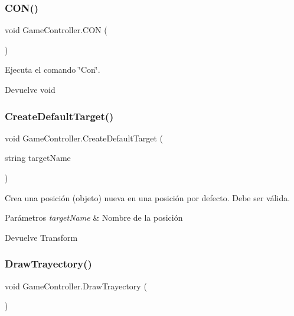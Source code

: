 \subsubsection{\texorpdfstring{CON()}{CON()}}
{\footnotesize\ttfamily void Game\+Controller.\+C\+ON (\begin{DoxyParamCaption}{ }\end{DoxyParamCaption})\hspace{0.3cm}{\ttfamily [inline]}}

Ejecuta el comando \char`\"{}\+Con\char`\"{}. \begin{DoxyReturn}{Devuelve}
void 
\end{DoxyReturn}
\mbox{\label{class_game_controller_a0f08cc86bd15fbe811ce9e54a83e67d9}} 
\subsubsection{\texorpdfstring{CreateDefaultTarget()}{CreateDefaultTarget()}}
{\footnotesize\ttfamily void Game\+Controller.\+Create\+Default\+Target (\begin{DoxyParamCaption}\item[{string}]{target\+Name }\end{DoxyParamCaption})\hspace{0.3cm}{\ttfamily [inline]}}

Crea una posición (objeto) nueva en una posición por defecto. Debe ser válida. 
\begin{DoxyParams}{Parámetros}
{\em target\+Name} & Nombre de la posición \\
\hline
\end{DoxyParams}
\begin{DoxyReturn}{Devuelve}
Transform 
\end{DoxyReturn}
\mbox{\label{class_game_controller_afd55aa0db0046a73a2b9bb57dc56d373}} 
\subsubsection{\texorpdfstring{DrawTrayectory()}{DrawTrayectory()}}
{\footnotesize\ttfamily void Game\+Controller.\+Draw\+Trayectory (\begin{DoxyParamCaption}{ }\end{DoxyParamCaption})\hspace{0.3cm}{\ttfamily [inline]}}

